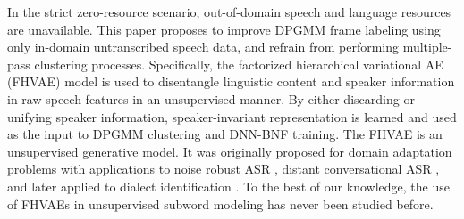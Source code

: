 \documentclass[a4paper]{article}
\begin{document}
In the strict zero-resource scenario, out-of-domain speech and language resources are unavailable. 
This paper proposes to improve DPGMM  frame labeling using only in-domain untranscribed speech data, and refrain from performing multiple-pass clustering processes.
Specifically, the factorized hierarchical variational AE (FHVAE) model \cite{hsu2017nips} is used to disentangle linguistic content and speaker information in raw speech features in an unsupervised manner. By either discarding or unifying speaker information, speaker-invariant representation is learned and  used as the input to DPGMM clustering and DNN-BNF training. 
The FHVAE is an unsupervised generative model.
It was originally proposed for domain adaptation problems with applications to noise robust ASR \cite{hsu2018extracting}, distant conversational ASR \cite{hsu2018unsup},  and later applied to dialect identification \cite{shon2018unsup}. To the best of our knowledge, the use of FHVAEs in unsupervised subword modeling  has never been studied before. 
\end{document}
